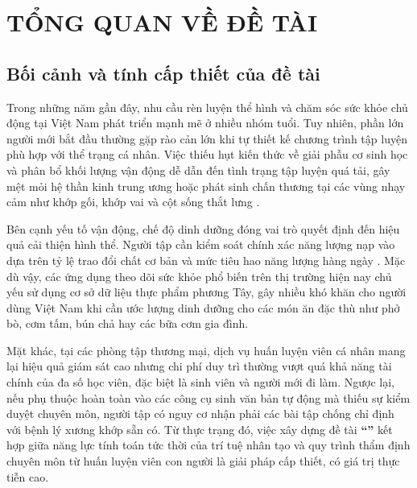 
\chapter{TỔNG QUAN VỀ ĐỀ TÀI}
\label{chap:tongquan}

\section{Bối cảnh và tính cấp thiết của đề tài}
\label{sec:boicanh}

Trong những năm gần đây, nhu cầu rèn luyện thể hình và chăm sóc sức khỏe chủ động tại Việt Nam phát triển mạnh mẽ ở nhiều nhóm tuổi. Tuy nhiên, phần lớn người mới bắt đầu thường gặp rào cản lớn khi tự thiết kế chương trình tập luyện phù hợp với thể trạng cá nhân. Việc thiếu hụt kiến thức về giải phẫu cơ sinh học và phân bổ khối lượng vận động dễ dẫn đến tình trạng tập luyện quá tải, gây mệt mỏi hệ thần kinh trung ương hoặc phát sinh chấn thương tại các vùng nhạy cảm như khớp gối, khớp vai và cột sống thắt lưng \cite{helms2016rpe}.

Bên cạnh yếu tố vận động, chế độ dinh dưỡng đóng vai trò quyết định đến hiệu quả cải thiện hình thể. Người tập cần kiểm soát chính xác năng lượng nạp vào dựa trên tỷ lệ trao đổi chất cơ bản và mức tiêu hao năng lượng hàng ngày \cite{mifflin1990new}. Mặc dù vậy, các ứng dụng theo dõi sức khỏe phổ biến trên thị trường hiện nay chủ yếu sử dụng cơ sở dữ liệu thực phẩm phương Tây, gây nhiều khó khăn cho người dùng Việt Nam khi cần ước lượng dinh dưỡng cho các món ăn đặc thù như phở bò, cơm tấm, bún chả hay các bữa cơm gia đình.

Mặt khác, tại các phòng tập thương mại, dịch vụ huấn luyện viên cá nhân mang lại hiệu quả giám sát cao nhưng chi phí duy trì thường vượt quá khả năng tài chính của đa số học viên, đặc biệt là sinh viên và người mới đi làm. Ngược lại, nếu phụ thuộc hoàn toàn vào các công cụ sinh văn bản tự động mà thiếu sự kiểm duyệt chuyên môn, người tập có nguy cơ nhận phải các bài tập chống chỉ định với bệnh lý xương khớp sẵn có. Từ thực trạng đó, việc xây dựng đề tài \textbf{``\reporttitle''} kết hợp giữa năng lực tính toán tức thời của trí tuệ nhân tạo và quy trình thẩm định chuyên môn từ huấn luyện viên con người là giải pháp cấp thiết, có giá trị thực tiễn cao.

